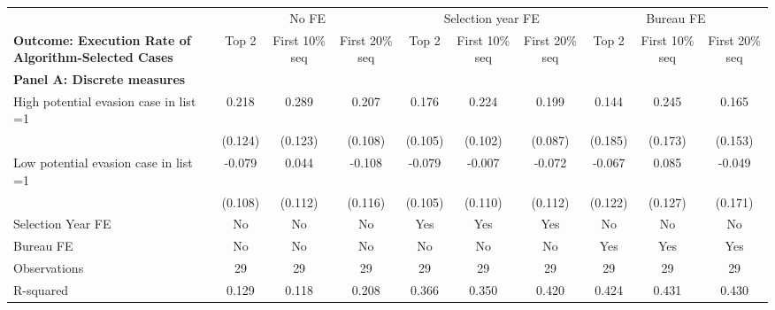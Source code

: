 \begin{tabular}{l*{9}{c}} \toprule
            &\multicolumn{3}{c}{No FE}                                        &\multicolumn{3}{c}{Selection year FE}                            &\multicolumn{3}{c}{Bureau FE}                                    \\\cmidrule(lr){2-4}\cmidrule(lr){5-7}\cmidrule(lr){8-10}
\multicolumn{1}{l}{\textbf{Outcome: Execution Rate of Algorithm-Selected Cases}} & Top 2 & First 10\% seq & First 20\% seq & Top 2 & First 10\% seq & First 20\% seq & Top 2 & First 10\% seq & First 20\% seq \\ \midrule \multicolumn{10}{l}{\textbf{Panel A: Discrete measures}}\\ \addlinespace
High potential evasion case in list =1&       0.218\sym{*}  &       0.289\sym{**} &       0.207\sym{*}  &       0.176         &       0.224\sym{**} &       0.199\sym{**} &       0.144         &       0.245         &       0.165         \\
            &     (0.124)         &     (0.123)         &     (0.108)         &     (0.105)         &     (0.102)         &     (0.087)         &     (0.185)         &     (0.173)         &     (0.153)         \\
\addlinespace
Low potential evasion case in list =1&      -0.079         &       0.044         &      -0.108         &      -0.079         &      -0.007         &      -0.072         &      -0.067         &       0.085         &      -0.049         \\
            &     (0.108)         &     (0.112)         &     (0.116)         &     (0.105)         &     (0.110)         &     (0.112)         &     (0.122)         &     (0.127)         &     (0.171)         \\
\midrule
Selection Year FE&          No         &          No         &          No         &         Yes         &         Yes         &         Yes         &          No         &          No         &          No         \\
Bureau FE   &          No         &          No         &          No         &          No         &          No         &          No         &         Yes         &         Yes         &         Yes         \\
Observations&          29         &          29         &          29         &          29         &          29         &          29         &          29         &          29         &          29         \\
R-squared   &       0.129         &       0.118         &       0.208         &       0.366         &       0.350         &       0.420         &       0.424         &       0.431         &       0.430         \\


\end{tabular}
